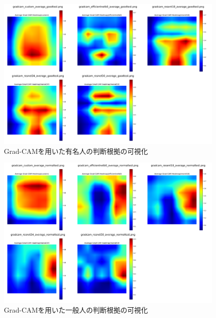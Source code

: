 \documentclass[a4paper,11pt,titlepage]{jsarticle}
\begin{document}
	
\begin{figure}[htbp]
    \centering
    \includegraphics[width=1.1\textwidth]{combined_images_good.png}
    \caption{Grad-CAMを用いた有名人の判断根拠の可視化}
    \label{fig:gradcam_good}
\end{figure}
\begin{figure}[H]
    \centering
    \includegraphics[width=1.1\textwidth]{combined_images_normal.png}
    \caption{Grad-CAMを用いた一般人の判断根拠の可視化}
    \label{fig:gradcam_normal}
\end{figure}
\end{document}
